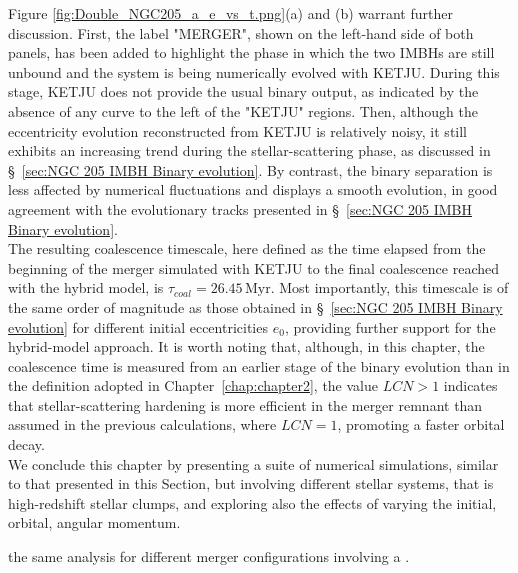 \documentclass[12pt,twoside,openany]{book}
\begin{document}
Figure \ref{fig:Double_NGC205_a_e_vs_t.png}(a) and (b) warrant further discussion. First, the label "MERGER", shown on the left-hand side of both panels, has been added to highlight the phase in which the two IMBHs are still unbound and the system is being numerically evolved with KETJU. During this stage, KETJU does not provide the usual binary output, as indicated by the absence of any curve to the left of the "KETJU" regions. Then, although the eccentricity evolution reconstructed from KETJU is relatively noisy, it still exhibits an increasing trend during the stellar-scattering phase, as discussed in \S~\ref{sec:NGC 205 IMBH Binary evolution}. By contrast, the binary separation is less affected by numerical fluctuations and displays a smooth evolution, in good agreement with the evolutionary tracks presented in \S~\ref{sec:NGC 205 IMBH Binary evolution}.\\The resulting coalescence timescale, here defined as the time elapsed from the beginning of the merger simulated with KETJU to the final coalescence reached with the hybrid model, is $\tau_{coal}= 26.45 \,\mathrm{Myr}$. Most importantly, this timescale is of the same order of magnitude as those obtained in \S~\ref{sec:NGC 205 IMBH Binary evolution} for different initial eccentricities $e_0$, providing further support for the hybrid-model approach. It is worth noting that, although, in this chapter, the coalescence time is measured from an earlier stage of the binary evolution than in the definition adopted in Chapter~\ref{chap:chapter2}, the value $LCN>1$ indicates that stellar-scattering hardening is more efficient in the merger remnant than assumed in the previous calculations, where $LCN=1$, promoting a faster orbital decay.\\We conclude this chapter by presenting a suite of numerical simulations, similar to that presented in this Section, but involving different stellar systems, that is high-redshift stellar clumps, and exploring also the effects of varying the initial, orbital, angular momentum.









the same analysis for different merger configurations involving a .
\end{document}
